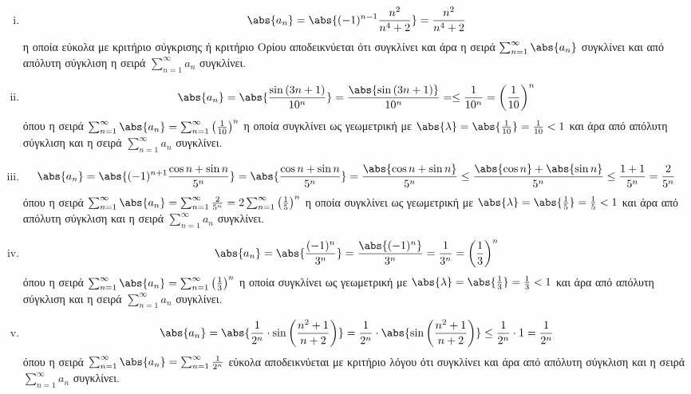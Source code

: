 \begin{enumerate}
\begin{enumerate}[i)]
      \item 
        \[
          \abs{a_{n}} = \abs{(-1)^{n-1} \frac{n^{2}}{n^{4}+2}} = 
          \frac{n^{2}}{n^{4}+2}  
        \] 
        η οποία εύκολα με κριτήριο σύγκρισης ή κριτήριο Ορίου αποδεικνύεται ότι 
        συγκλίνει και άρα η σειρά $ \sum_{n=1}^{\infty} \abs{a_{n}} $ συγκλίνει
        και από απόλυτη σύγκλιση η σειρά $ \sum_{n=1}^{\infty} a_{n} $ συγκλίνει.

      \item 
        \[
          \abs{a_{n}} = \abs{\frac{\sin{(3n+1)}}{10^{n}}} = 
          \frac{\abs{\sin{(3n+1)}}}{10^{n}} = 
          \leq \frac{1}{10^{n}} = \left(\frac{1}{10}\right)^{n} 
        \] 
        όπου η σειρά $ \sum_{n=1}^{\infty} \abs{a_{n}} = \sum_{n=1}^{\infty} 
        \left(\frac{1}{10}\right)^{n} $
        η οποία συγκλίνει ως γεωμετρική με 
        $ \abs{\lambda} = \abs{\frac{1}{10}} = \frac{1}{10}<1 $ και άρα από 
        απόλυτη σύγκλιση και η σειρά $ \sum_{n=1}^{\infty} a_{n} $ συγκλίνει.

      \item 
        \[
          \abs{a_{n}} = \abs{(-1)^{n+1} \frac{\cos{n} + \sin{n}}{5^{n}}} = 
          \abs{\frac{\cos{n} + \sin{n}}{5^{n}}} = 
          \frac{\abs{\cos{n} + \sin{n}}}{5^{n}}
          \leq \frac{\abs{\cos{n}} + \abs{\sin{n}}}{5^{n}} 
          \leq \frac{1+1}{5^{n}} = \frac{2}{5^{n}}  
        \] 
        όπου η σειρά $ \sum_{n=1}^{\infty} \abs{a_{n}} = \sum_{n=1}^{\infty} 
        \frac{2}{5^{n}} = 2 \sum_{n=1}^{\infty} \left(\frac{1}{5} \right)^{n} $
        η οποία συγκλίνει ως γεωμετρική με 
        $ \abs{\lambda} = \abs{\frac{1}{5}} = \frac{1}{ 5} <1 $ και άρα από 
        απόλυτη σύγκλιση και η σειρά $ \sum_{n=1}^{\infty} a_{n} $ συγκλίνει.

      \item 
        \[
          \abs{a_{n}} = \abs{\frac{(-1)^{n}}{3^{n}}} = 
          \frac{\abs{(-1)^{n}}}{3^{n}} = \frac{1}{3^{n}} = 
          \left(\frac{1}{3}\right)^{n} 
        \] 
        όπου η σειρά $ \sum_{n=1}^{\infty} \abs{a_{n}} = \sum_{n=1}^{\infty} 
        \left(\frac{1}{3}\right)^{n} $
        η οποία συγκλίνει ως γεωμετρική με 
        $ \abs{\lambda} = \abs{\frac{1}{3}} = \frac{1}{3}<1 $ και άρα από 
        απόλυτη σύγκλιση και η σειρά $ \sum_{n=1}^{\infty} a_{n} $ συγκλίνει.

      \item 
        \[
          \abs{a_{n}} = \abs{\frac{1}{2^{n}} \cdot 
          \sin{\left(\frac{n^{2}+1}{n+2}\right)}} =
          \frac{1}{2^{n}} \cdot \abs{\sin{\left(\frac{n^{2}+1}{n+2}\right)}} 
          \leq \frac{1}{2^{n}} \cdot 1 = \frac{1}{2^{n}}
        \] 
        όπου η σειρά $ \sum_{n=1}^{\infty} \abs{a_{n}} = 
        \sum_{n=1}^{\infty} \frac{1}{2^{n}}  $ εύκολα αποδεικνύεται με 
        κριτήριο λόγου ότι συγκλίνει και άρα από απόλυτη σύγκλιση και η σειρά
        $ \sum_{n=1}^{\infty} a_{n} $ συγκλίνει.


\end{enumerate}
\end{enumerate}
